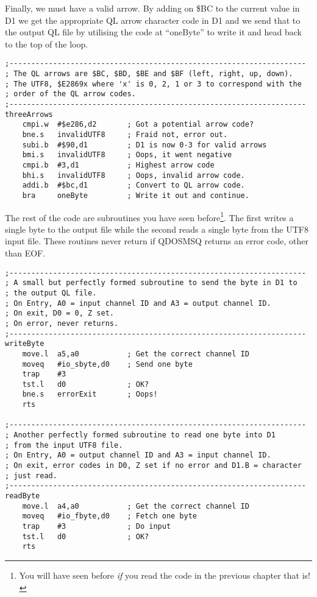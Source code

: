 Finally, we must have a valid arrow. By adding on \$BC to the current
value in D1 we get the appropriate QL arrow character code in D1 and
we send that to the output QL file by utilising the code at ``oneByte''
to write it and head back to the top of the loop.

\begin{lstlisting}[firstnumber=last,caption={Utf82Ql: Handling the arrow characters}]
;--------------------------------------------------------------------
; The QL arrows are $BC, $BD, $BE and $BF (left, right, up, down). 
; The UTF8, $E2869x where 'x' is 0, 2, 1 or 3 to correspond with the
; order of the QL arrow codes.
;--------------------------------------------------------------------
threeArrows
    cmpi.w  #$e286,d2       ; Got a potential arrow code?
    bne.s   invalidUTF8     ; Fraid not, error out.
    subi.b  #$90,d1         ; D1 is now 0-3 for valid arrows
    bmi.s   invalidUTF8     ; Oops, it went negative
    cmpi.b  #3,d1           ; Highest arrow code
    bhi.s   invalidUTF8     ; Oops, invalid arrow code.
    addi.b  #$bc,d1         ; Convert to QL arrow code.
    bra     oneByte         ; Write it out and continue.
\end{lstlisting}

The rest of the code are subroutines you have seen before\footnote{You will have seen before \emph{if} you read the code in the previous
chapter that is!}. The first writes a single byte to the output file while the second
reads a single byte from the UTF8 input file. These routines never
return if QDOSMSQ returns an error code, other than EOF.

\begin{lstlisting}[firstnumber=last,caption={Utf82Ql: Writing and reading bytes}]
;--------------------------------------------------------------------
; A small but perfectly formed subroutine to send the byte in D1 to
; the output QL file. 
; On Entry, A0 = input channel ID and A3 = output channel ID. 
; On exit, D0 = 0, Z set.
; On error, never returns.
;--------------------------------------------------------------------
writeByte
    move.l  a5,a0           ; Get the correct channel ID
    moveq   #io_sbyte,d0    ; Send one byte
    trap    #3
    tst.l   d0              ; OK?
    bne.s   errorExit       ; Oops!
    rts

;--------------------------------------------------------------------
; Another perfectly formed subroutine to read one byte into D1
; from the input UTF8 file. 
; On Entry, A0 = output channel ID and A3 = input channel ID.
; On exit, error codes in D0, Z set if no error and D1.B = character
; just read.
;--------------------------------------------------------------------
readByte
    move.l  a4,a0           ; Get the correct channel ID
    moveq   #io_fbyte,d0    ; Fetch one byte
    trap    #3              ; Do input
    tst.l   d0              ; OK?
    rts
\end{lstlisting}

